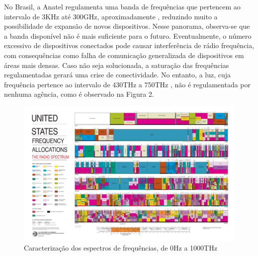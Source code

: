 \documentclass[
12pt,				%
openright,			%
twoside,			%
a4paper,			%
hyphens,
english,			%
french,				%
spanish,			%
brazil				%
]{abntex2}
\begin{document}
		No Brasil, a Anatel regulamenta uma banda de frequências que pertencem ao intervalo  de 3KHz até 300GHz, aproximadamente \cite{faixa-anatel}, reduzindo muito a possibilidade de expansão de novos dispositivos. Nesse panorama, observa-se que a banda disponível não é mais suficiente para o futuro. Eventualmente, o número excessivo de dispositivos conectados pode causar interferência de rádio frequência, com consequências como falha de comunicação generalizada de dispositivos em áreas mais densas. Caso não seja solucionada, a saturação das frequências regulamentadas gerará uma crise de conectividade. 
		No entanto, a luz, cuja frequência pertence ao intervalo de 430THz a 750THz \cite{vision}, não é regulamentada por nenhuma agência, como é observado na Figura 2.

		\begin{figure}[!htb]
			\caption{\label{fig_fcc}Caracterização dos espectros de frequências, de 0Hz a 1000THz}
			\begin{center}
				  \includegraphics[width=\textwidth, trim={36.5cm 3.1cm 40cm 61cm},clip]{2003-allochrt.pdf}
				
			\end{center}
		\end{figure}
		
\end{document}
